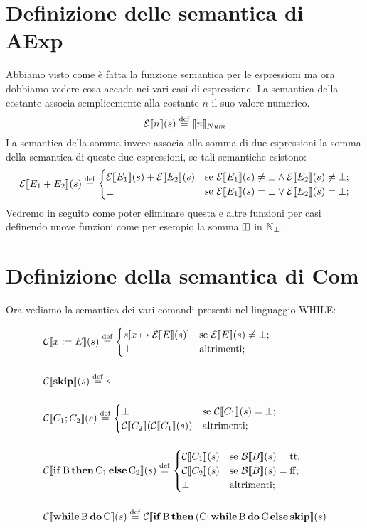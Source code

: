 \section{Definizione delle semantica di AExp} 
Abbiamo visto come è fatta la funzione semantica per le espressioni ma ora dobbiamo vedere cosa accade nei vari casi di espressione. La semantica della costante associa semplicemente alla costante $n$ il suo valore numerico.
$$ \denot{\calE}{n}{s} \defeq \llbracket n \rrbracket_{Num}$$
La semantica della somma invece associa alla somma di due espressioni la somma della semantica di queste due espressioni, se tali semantiche esistono:
$$ \denot{\calE}{E_1 + E_2}{s} \defeq \begin{cases}
        \denot{\calE}{E_1}{s} + \denot{\calE}{E_2}{s} & \text{se } \denot{\calE}{E_1}{s} \neq \bot \land \denot{\calE}{E_2}{s} \neq \bot;\\
        \bot & \text{se } \denot{\calE}{E_1}{s} = \bot \lor \denot{\calE}{E_2}{s} = \bot;\\
        \end{cases}
$$
Vedremo in seguito come poter eliminare questa e altre funzioni per casi definendo nuove funzioni come per esempio la somma $\mathbin{\boxplus}$ in $\mathbb{N}_\bot$.

\section{Definizione della semantica di Com} 
Ora vediamo la semantica dei vari comandi presenti nel linguaggio WHILE:

\begin{align*}
&\denot{\calC}{x \weq E}{s} \defeq \begin{cases}
        \assign{s}{x}{\denot{\calE}{E}{s}} & \text{se } \denot{\calE}{E}{s} \neq \bot;\\
        \bot & \text{altrimenti};
        \end{cases}
\pts
&\denot{\calC}{\kw{skip}}{s} \defeq s
\pts
&\denot{\calC}{C_1 ; C_2}{s} \defeq \begin{cases}
        \bot & \text{se } \denot{\calC}{C_1}{s} = \bot;\\
        \denot{\calC}{C_2}{\denot{\calC}{C_1}{s}} & \text{altrimenti};\\
        \end{cases}
\pts
&\denot{\calC}{\condif{B}{C_1}{C_2}}{s} \defeq \begin{cases}
        \denot{\calC}{C_1}{s} & \text{se } \denot{\calB}{B}{s} = \ttv ;\\
        \denot{\calC}{C_2}{s} & \text{se } \denot{\calB}{B}{s} = \ffv ;\\
        \bot & \text{altrimenti};
        \end{cases}
\pts
&\denot{\calC}{\while{B}{C}}{s} \defeq \denot{\calC}{\condif{B}{(C ; \while{B}{C}}{\kw{skip}}}{s}
\end{align*}

